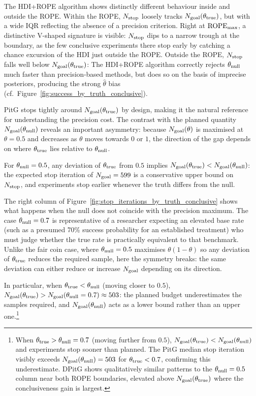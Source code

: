 The HDI+ROPE algorithm shows distinctly different behaviour inside and outside the ROPE.
Within the ROPE, $N_{\rm stop}$ loosely tracks $N_{\rm goal}(\theta_{\rm true})$, but
with a wide IQR reflecting the absence of a precision criterion.
Right at ${\rm ROPE}_{\rm max}$, a distinctive V-shaped signature is visible:
$N_{\rm stop}$ dips to a narrow trough at the boundary, as the few conclusive
experiments there stop early by catching a chance excursion of the HDI just outside
the ROPE. 
Outside the ROPE, $N_{\rm stop}$ falls well below $N_{\rm goal}(\theta_{\rm true})$:
The HDI+ROPE algorithm correctly
rejects $\theta_{\rm null}$ much faster than precision-based methods, but does so on
the basis of imprecise posteriors, producing the strong $\hat{\theta}$ bias
(cf.\ Figure~\ref{fig:success_by_truth_conclusive}).

PitG stops tightly around $N_{\rm goal}(\theta_{\rm true})$ by design, making it the
natural reference for understanding the precision cost. The contrast with the planned
quantity $N_{\rm goal}(\theta_{\rm null})$ reveals an important asymmetry: because
$N_{\rm goal}(\theta)$ is maximised at $\theta=0.5$ and decreases as $\theta$ moves
towards $0$ or $1$, the direction of the gap depends on where $\theta_{\rm true}$ lies
relative to $\theta_{\rm null}$.

For $\theta_{\rm null}=0.5$, any deviation of $\theta_{\rm true}$ from $0.5$ implies
$N_{\rm goal}(\theta_{\rm true}) < N_{\rm goal}(\theta_{\rm null})$: the expected stop
iteration of $N_{\rm goal}=599$ is a conservative upper bound on $N_{\rm stop}$,
and experiments stop earlier whenever the truth differs from the null.

The right column of Figure~\ref{fig:stop_iterations_by_truth_conclusive} shows what
happens when the null does not coincide with the precision maximum.
The case $\theta_{\rm null}=0.7$ is representative of a researcher expecting an elevated
base rate (such as a presumed 70\% success probability for an established treatment)
who must judge whether the true rate is practically equivalent to that benchmark.
Unlike the fair coin case, where $\theta_{\rm null}=0.5$ maximises $\theta(1-\theta)$
so any deviation of $\theta_{\rm true}$ reduces the required sample, here the symmetry
breaks: the same deviation can either reduce or increase $N_{\rm goal}$ depending on
its direction.

In particular, when $\theta_{\rm true}<\theta_{\rm null}$ (moving closer to $0.5$),
$N_{\rm goal}(\theta_{\rm true})>N_{\rm goal}(\theta_{\rm null}=0.7)\approx 503$:
the planned budget underestimates the samples required, and
$N_{\rm goal}(\theta_{\rm null})$ acts as a lower bound rather than an upper
one.\footnote{When $\theta_{\rm true}>\theta_{\rm null}=0.7$ (moving further from
$0.5$), $N_{\rm goal}(\theta_{\rm true})<N_{\rm goal}(\theta_{\rm null})$ and
experiments stop sooner than planned.
The PitG median stop iteration visibly exceeds $N_{\rm goal}(\theta_{\rm null})=503$
for $\theta_{\rm true}<0.7$, confirming this underestimate.
DPitG shows qualitatively similar patterns to the $\theta_{\rm null}=0.5$ column
near both ROPE boundaries, elevated above $N_{\rm goal}(\theta_{\rm true})$ where
the conclusiveness gain is largest.}

